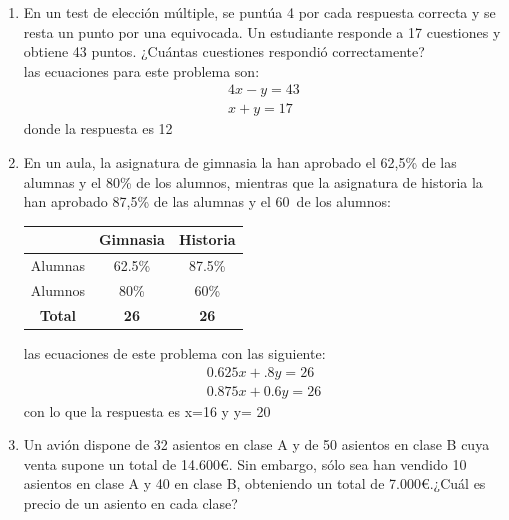 \documentclass[12pt,letterpaper]{report}
\begin{document}
\begin{enumerate}
\begin{equation*}
\begin{matrix}
            y-5=3(x-5) \\ y+10=2(x+10)
        \end{matrix}
    \end{equation*}
    las respuestas son 11 y 32
    \item En un test de elección múltiple, se puntúa 4 por cada respuesta correcta y se resta un
    punto por una equivocada. Un estudiante responde a 17 cuestiones y obtiene 43
    puntos. ¿Cuántas cuestiones respondió correctamente?\\
    las ecuaciones para este problema son:
    \begin{equation*}
        \begin{matrix}
            4x-y=43 \\ x+y=17
        \end{matrix}
    \end{equation*}
    donde la respuesta es 12
    \item En un aula, la asignatura de gimnasia la han aprobado el 62,5\% de las alumnas y el 80\% de los alumnos, mientras que la asignatura de historia la han aprobado 87,5\% de las alumnas y el 60\ de los alumnos: 
    \begin{table}[H]
        \centering 
        \begin{tabular}{|c|c|c|}\hline
            & \textbf{Gimnasia} & \textbf{Historia} \\ \hline
            Alumnas & 62.5\% & 87.5\% \\ \hline
            Alumnos & 80\% & 60\% \\ \hline
            \textbf{Total} & \textbf{26} & \textbf{26}\\ \hline
        \end{tabular}
    \end{table}
    las ecuaciones de este problema con las siguiente:
    \begin{equation*}
        \begin{matrix}
            0.625x+.8y=26 \\ 0.875x+0.6y=26
        \end{matrix}
    \end{equation*}
    con lo que la respuesta es x=16 y y= 20
    \item Un avión dispone de 32 asientos en clase A y de 50 asientos en clase B cuya venta supone un total de 14.600€. Sin embargo, sólo sea han vendido 10 asientos en clase A y 40 en clase B, obteniendo un total de 7.000€.¿Cuál es precio de un asiento en cada clase?\\

\end{enumerate}
\end{document}
